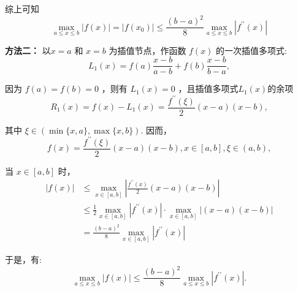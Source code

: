 \begin{tcolorbox}
综上可知 $$ \max _{a \leq x \leq b}|f(x)|=|f(x_0)| \leq \frac{(b-a)^{2}}{8} \max _{a \leq x \leq b}\left|f^{\prime \prime}(x)\right| $$

\textbf{方法二：}
以$ x=a $ 和 $ x=b $ 为插值节点，作函数 $ f(x) $ 的一次插值多项式:
$$
L_{1}(x)=f(a) \frac{x-b}{a-b}+f(b) \frac{x-b}{b-a},
$$

因为 $ f(a)=f(b)=0 $ ，则有 $ L_{1}(x)=0 $ ，且插值多项式$L_{1}(x)$的余项
$$
R_1(x)=f(x)-L_{1}(x)=\frac{f^{\prime \prime}(\xi)}{2}(x-a)(x-b),
$$

其中 $ \xi \in(\min \{x, a\}, \max \{x, b\}) $. 因而，
$$
f(x)=\frac{f^{\prime \prime}(\xi)}{2}(x-a)(x-b), x \in[a, b], \xi \in(a, b),
$$

当 $ x \in[a, b] $ 时，
$$
\begin{aligned}
|f(x)| &\leq \max_{x\in[a,b]} \left|\frac{f^{\prime \prime}(x)}{2}(x-a)(x-b)\right| \\
&\leq \frac{1}{2} \max _{x \in[a, b]}\left|f^{\prime \prime}(x)\right| \cdot \max _{x \in[a, b]}|(x-a)(x-b)| \\
&=\frac{(b-a)^{2}}{8} \max _{x \in[a, b]}\left|f^{\prime \prime}(x)\right|
\end{aligned}
$$

于是，有:
$$
\max _{a \leq x \leq b}|f(x)| \leq \frac{(b-a)^{2}}{8} \max _{a \leq x \leq b}\left|f^{\prime \prime}(x)\right| .
$$
\end{tcolorbox}



